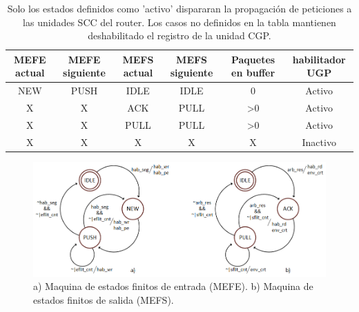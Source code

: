 \begin{table}[]
\centering
\begin{adjustbox}{width=1\textwidth}
\begin{tabular}{@{}cccccc@{}}
\toprule
\rowcolor[HTML]{343434} 
{\color[HTML]{FFFFFF} MEFE actual} & {\color[HTML]{FFFFFF} MEFE siguiente} & {\color[HTML]{FFFFFF} MEFS actual} & {\color[HTML]{FFFFFF} MEFS siguiente} & {\color[HTML]{FFFFFF} Paquetes en buffer} & {\color[HTML]{FFFFFF} habilitador UGP} \\ \midrule
NEW                                & PUSH                                  & IDLE                               & IDLE                                  & 0                                         & Activo                                 \\
\rowcolor[HTML]{EFEFEF} 
X                                  & X                                     & ACK                                & PULL                                  & \textgreater0                             & Activo                                 \\
X                                  & X                                     & PULL                               & PULL                                  & \textgreater0                             & Activo                                 \\
\rowcolor[HTML]{EFEFEF} 
X                                  & X                                     & X                                  & X                                     & X                                         & Inactivo                               \\ \bottomrule
\end{tabular}
\end{adjustbox}
\caption{Solo los estados definidos como 'activo' dispararan la propagación de peticiones a las unidades SCC del router. Los casos no definidos en la tabla mantienen deshabilitado el registro de la unidad CGP.}
\label{tab:CGP}
\end{table}


\begin{figure}
	\begin{center}
		\includegraphics[width=\linewidth]{figures/ch4_pde_fsm.png}
	\end{center}
	\caption
		{	
			a) Maquina de estados finitos de entrada (MEFE). b) Maquina de estados finitos de salida (MEFS).
		}
	\label{fig:ch4_pde_fsm}
\end{figure}

